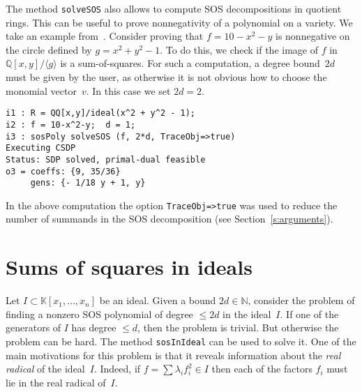 \documentclass[11pt]{amsart}
\theoremstyle{plain}%
\theoremstyle{definition}
\theoremstyle{remark}
\newcommand{\SOS}{\textsc{SOS}\xspace}
\newcommand{\QQ}{\mathbb{Q}}
\newcommand{\NN}{\mathbb{N}}
\newcommand{\kk}{\mathbb{K}}
\begin{document}
The method \verb|solveSOS| also allows to compute SOS decompositions in quotient rings.
This can be useful to prove nonnegativity of a polynomial on a variety.
We take an example from~\cite{parrilo2005exploiting}.
Consider proving that $f = 10{-}x^2{-}y$ is nonnegative on the circle defined by $g = x^2 {+} y^2 {-} 1$.
To do this, we check if the image of $f$ in $\QQ[x,y]/\langle g\rangle$ is a sum-of-squares.
For such a computation, a degree bound~$2d$ must be given by the user, as otherwise it is not obvious how to choose the monomial vector~$v$.
In this case we set $2d=2$.
{\small
\begin{verbatim}
i1 : R = QQ[x,y]/ideal(x^2 + y^2 - 1);
i2 : f = 10-x^2-y;  d = 1;
i3 : sosPoly solveSOS (f, 2*d, TraceObj=>true)
Executing CSDP
Status: SDP solved, primal-dual feasible
o3 = coeffs: {9, 35/36}
     gens: {- 1/18 y + 1, y}
\end{verbatim}
}
\noindent
In the above computation the option \verb|TraceObj=>true| was used to reduce the number of summands in the SOS decomposition (see Section~\ref{s:arguments}).


\section{Sums of squares in ideals}
Let $I \subset \kk[x_{1},\dots,x_{n}]$ be an ideal.  
Given a bound $2d\in\NN$, consider the problem of finding a nonzero SOS polynomial of degree $\leq \!2d$ in the ideal~$I$.
If one of the generators of $I$ has degree $\leq \!d$, then the problem is trivial.
But otherwise the problem can be hard.
The method \verb|sosInIdeal| can be used to solve it.
One of the main motivations for this problem is that it reveals information about the \emph{real radical} of the ideal~$I$.
Indeed, if $f = \sum \lambda_i f_i^2 \in I$ then each of the factors $f_i$ must lie in the real radical of~$I$.
\end{document}
